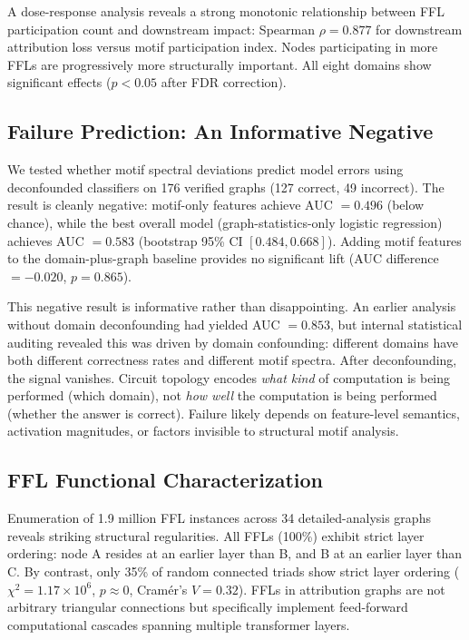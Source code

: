 \documentclass[11pt,letterpaper]{article}
\begin{document}
A dose-response analysis reveals a strong monotonic relationship between FFL participation count and downstream impact: Spearman $\rho = 0.877$ for downstream attribution loss versus motif participation index. Nodes participating in more FFLs are progressively more structurally important. All eight domains show significant effects ($p < 0.05$ after FDR correction).

\subsection{Failure Prediction: An Informative Negative}
\label{sec:failure}

We tested whether motif spectral deviations predict model errors using deconfounded classifiers on 176 verified graphs (127 correct, 49 incorrect). The result is cleanly negative: motif-only features achieve AUC $= 0.496$ (below chance), while the best overall model (graph-statistics-only logistic regression) achieves AUC $= 0.583$ (bootstrap 95\% CI $[0.484, 0.668]$). Adding motif features to the domain-plus-graph baseline provides no significant lift (AUC difference $= -0.020$, $p = 0.865$).

This negative result is informative rather than disappointing. An earlier analysis without domain deconfounding had yielded AUC $= 0.853$, but internal statistical auditing revealed this was driven by domain confounding: different domains have both different correctness rates and different motif spectra. After deconfounding, the signal vanishes. Circuit topology encodes \emph{what kind} of computation is being performed (which domain), not \emph{how well} the computation is being performed (whether the answer is correct). Failure likely depends on feature-level semantics, activation magnitudes, or factors invisible to structural motif analysis.

\subsection{FFL Functional Characterization}
\label{sec:functional}

Enumeration of 1.9 million FFL instances across 34 detailed-analysis graphs reveals striking structural regularities. All FFLs (100\%) exhibit strict layer ordering: node A resides at an earlier layer than B, and B at an earlier layer than C. By contrast, only 35\% of random connected triads show strict layer ordering ($\chi^2 = 1.17 \times 10^{6}$, $p \approx 0$, Cram\'{e}r's $V = 0.32$). FFLs in attribution graphs are not arbitrary triangular connections but specifically implement feed-forward computational cascades spanning multiple transformer layers.
\end{document}
